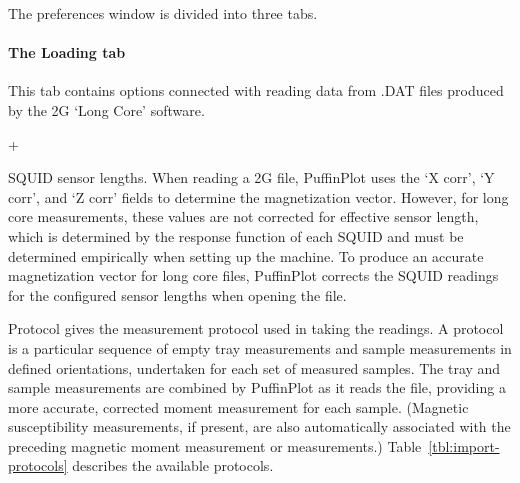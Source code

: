 \documentclass[a4paper,british]{article}
\newcommand{\menuitemlabel}[1]{%
\mbox{\textsf{#1}}\hfil}
\newenvironment{menuitemlist}%
{\begin{list}{}{%
\renewcommand{\makelabel}{\menuitemlabel}%
\setlength{\labelwidth}{35pt}%
\setlength{\leftmargin}%
             {\labelwidth+\labelsep}}}%
{\end{list}}
\newcommand{\ppcmd}[1]{\textsf{#1}} %
\newcommand{\caps}[1]{\MakeTextUppercase{#1}} %
\begin{document}
The preferences window is divided into three tabs.

\paragraph{The \ppcmd{Loading} tab}

This tab contains options connected with reading data from \caps{.dat} files
produced by the \caps{2g} `Long Core' software.

\begin{menuitemlist}

\item[\caps{Squid} sensor lengths.] When reading a \caps{2g} file, PuffinPlot
  uses the `X corr', `Y corr', and `Z corr' fields to determine the
  magnetization vector. However, for long core measurements, these values are
  not corrected for effective sensor length, which is determined by the
  response function of each \caps{squid} and must be determined empirically
  when setting up the machine. To produce an accurate magnetization vector
  for long core files, PuffinPlot corrects the \caps{squid} readings for the
  configured sensor lengths when opening the file.

\item[Protocol] gives the measurement protocol used in taking the readings. A
  protocol is a particular sequence of empty tray measurements and sample
  measurements in defined orientations, undertaken for each set of measured
  samples. The tray and sample measurements are combined by PuffinPlot as it
  reads the file, providing a more accurate, corrected moment measurement for
  each sample. (Magnetic susceptibility measurements, if present, are also
  automatically associated with the preceding magnetic moment measurement or
  measurements.) Table~\ref{tbl:import-protocols} describes the
  available protocols.

\end{menuitemlist}
\end{document}
